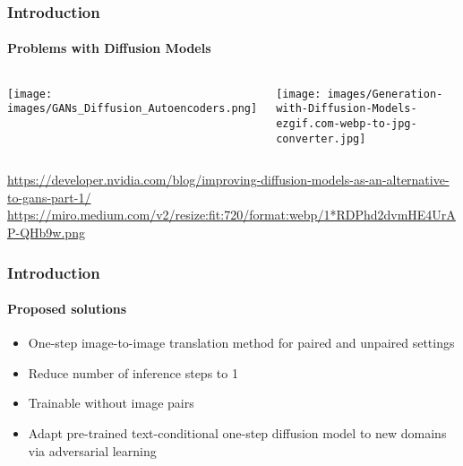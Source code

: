 \begin{frame}
    \frametitle{Introduction}
    \framesubtitle{Problems with Diffusion Models}
    
    \begin{columns}
        \centering
        \texttt{[image: images/GANs\_Diffusion\_Autoencoders.png]}
    
        \centering
        \texttt{[image: images/Generation-with-Diffusion-Models-ezgif.com-webp-to-jpg-converter.jpg]}
      \end{columns}  
      \tiny{\footnotemark \url{https://developer.nvidia.com/blog/improving-diffusion-models-as-an-alternative-to-gans-part-1/}}
      \tiny{\footnotemark \url{https://miro.medium.com/v2/resize:fit:720/format:webp/1*RDPhd2dvmHE4UrAP-QHb9w.png}}
    \end{frame}
    
    \begin{frame}
    \frametitle{Introduction}
    \framesubtitle{Proposed solutions}
    \begin{itemize}
        \item One-step image-to-image translation method for paired and unpaired settings
        \item Reduce number of inference steps to 1
        \item Trainable without image pairs
        \item Adapt pre-trained text-conditional one-step diffusion model to new domains via adversarial learning
    \end{itemize}
\end{frame}